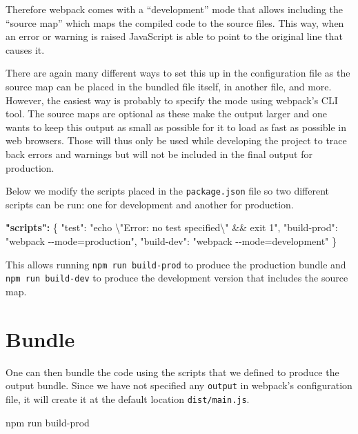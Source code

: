 \documentclass[
]{krantz}
\makeatletter
\newenvironment{Shaded}{\begin{snugshade}}{\end{snugshade}}
\newcommand{\CharTok}[1]{\textcolor[rgb]{0.5,0.5,0.5}{#1}}
\newcommand{\DataTypeTok}[1]{\textcolor[rgb]{0.27,0.27,0.27}{#1}}
\newcommand{\ErrorTok}[1]{\textcolor[rgb]{0.14,0.14,0.14}{\textbf{#1}}}
\newcommand{\ExtensionTok}[1]{#1}
\newcommand{\FunctionTok}[1]{\textcolor[rgb]{0,0,0}{#1}}
\newcommand{\NormalTok}[1]{#1}
\newcommand{\StringTok}[1]{\textcolor[rgb]{0.5,0.5,0.5}{#1}}
\newenvironment{kframe}{%
\medskip{}
\setlength{\fboxsep}{.8em}
 \def\at@end@of@kframe{}%
 \ifinner\ifhmode%
  \def\at@end@of@kframe{\end{minipage}}%
  \begin{minipage}{\columnwidth}%
 \fi\fi%
 \def\FrameCommand##1{\hskip\@totalleftmargin \hskip-\fboxsep
 \colorbox{shadecolor}{##1}\hskip-\fboxsep
     \hskip-\linewidth \hskip-\@totalleftmargin \hskip\columnwidth}%
 \MakeFramed {\advance\hsize-\width
   \@totalleftmargin\z@ \linewidth\hsize
   \@setminipage}}%
 {\par\unskip\endMakeFramed%
 \at@end@of@kframe}
\renewenvironment{Shaded}{\begin{kframe}}{\end{kframe}}
\makeatother
\begin{document}
Therefore webpack comes with a ``development'' mode that allows including the ``source map'' which maps the compiled code to the source files. This way, when an error or warning is raised JavaScript is able to point to the original line that causes it.

There are again many different ways to set this up in the configuration file as the source map can be placed in the bundled file itself, in another file, and more. However, the easiest way is probably to specify the mode using webpack's CLI tool. The source maps are optional as these make the output larger and one wants to keep this output as small as possible for it to load as fast as possible in web browsers. Those will thus only be used while developing the project to trace back errors and warnings but will not be included in the final output for production.

Below we modify the scripts placed in the \texttt{package.json} file so two different scripts can be run: one for development and another for production.

\begin{Shaded}
\begin{Highlighting}[]
\ErrorTok{"scripts":} \FunctionTok{\{}
  \DataTypeTok{"test"}\FunctionTok{:} \StringTok{"echo }\CharTok{\textbackslash{}"}\StringTok{Error: no test specified}\CharTok{\textbackslash{}"}\StringTok{ \&\& exit 1"}\FunctionTok{,}
  \DataTypeTok{"build{-}prod"}\FunctionTok{:} \StringTok{"webpack {-}{-}mode=production"}\FunctionTok{,}
  \DataTypeTok{"build{-}dev"}\FunctionTok{:} \StringTok{"webpack {-}{-}mode=development"}
\FunctionTok{\}}
\end{Highlighting}
\end{Shaded}

This allows running \texttt{npm\ run\ build-prod} to produce the production bundle and \texttt{npm\ run\ build-dev} to produce the development version that includes the source map.

\hypertarget{webpack-intro-bundle}{%
\section{Bundle}\label{webpack-intro-bundle}}

One can then bundle the code using the scripts that we defined to produce the output bundle. Since we have not specified any \texttt{output} in webpack's configuration file, it will create it at the default location \texttt{dist/main.js}.

\begin{Shaded}
\begin{Highlighting}[]
\ExtensionTok{npm}\NormalTok{ run build{-}prod}
\end{Highlighting}
\end{Shaded}
\end{document}
